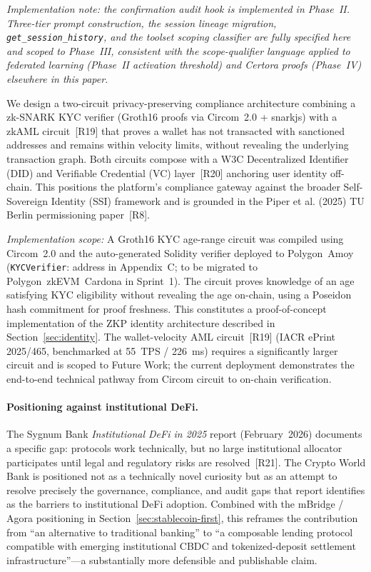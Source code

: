 \documentclass[12pt,a4paper]{report}
\begin{document}
\begin{description}[leftmargin=0pt]
\textit{Implementation note: the confirmation audit hook is implemented in
Phase~II. Three-tier prompt construction, the session lineage migration,
\texttt{get\_session\_history}, and the toolset scoping classifier are fully
specified here and scoped to Phase~III, consistent with the scope-qualifier
language applied to federated learning (Phase~II activation threshold) and
Certora proofs (Phase~IV) elsewhere in this paper.}

\item[\textbf{Contribution 4 --- Compliance-Aware ZKP / zkAML Identity Pathway.}]
We design a two-circuit privacy-preserving compliance architecture combining a zk-SNARK KYC verifier (Groth16 proofs via Circom~2.0 + snarkjs) with a zkAML circuit~[R19] that proves a wallet has not transacted with sanctioned addresses and remains within velocity limits, without revealing the underlying transaction graph. Both circuits compose with a W3C Decentralized Identifier (DID) and Verifiable Credential (VC) layer~[R20] anchoring user identity off-chain. This positions the platform's compliance gateway against the broader Self-Sovereign Identity (SSI) framework and is grounded in the Piper et al. (2025) TU Berlin permissioning paper~[R8].

\textit{Implementation scope:} A Groth16 KYC age-range circuit was compiled using Circom~2.0 and the auto-generated Solidity verifier deployed to Polygon~Amoy (\texttt{KYCVerifier}: address in Appendix~C; to be migrated to Polygon~zkEVM~Cardona in Sprint~1). The circuit proves knowledge of an age satisfying KYC eligibility without revealing the age on-chain, using a Poseidon hash commitment for proof freshness. This constitutes a proof-of-concept implementation of the ZKP identity architecture described in Section~\ref{sec:identity}. The wallet-velocity AML circuit~[R19] (IACR ePrint 2025/465, benchmarked at 55~TPS / 226~ms) requires a significantly larger circuit and is scoped to Future Work; the current deployment demonstrates the end-to-end technical pathway from Circom circuit to on-chain verification.

\end{description}

\paragraph{Positioning against institutional DeFi.}
The Sygnum Bank \textit{Institutional DeFi in 2025} report (February~2026) documents a specific gap: protocols work technically, but no large institutional allocator participates until legal and regulatory risks are resolved~[R21]. The Crypto World Bank is positioned not as a technically novel curiosity but as an attempt to resolve precisely the governance, compliance, and audit gaps that report identifies as the barriers to institutional DeFi adoption. Combined with the mBridge / Agora positioning in Section~\ref{sec:stablecoin-first}, this reframes the contribution from ``an alternative to traditional banking'' to ``a composable lending protocol compatible with emerging institutional CBDC and tokenized-deposit settlement infrastructure''---a substantially more defensible and publishable claim.
\end{document}
